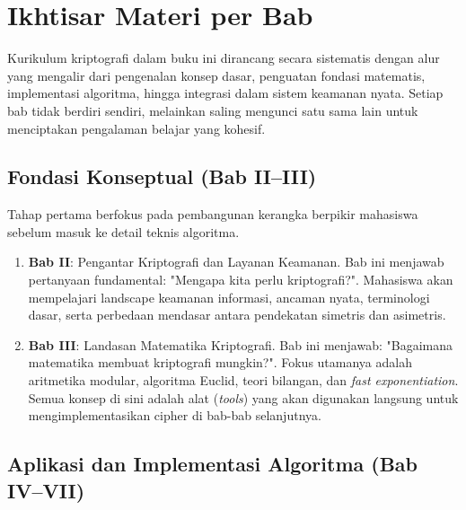 \section{Ikhtisar Materi per Bab}

Kurikulum kriptografi dalam buku ini dirancang secara sistematis dengan alur yang mengalir dari pengenalan konsep dasar, penguatan fondasi matematis, implementasi algoritma, hingga integrasi dalam sistem keamanan nyata. Setiap bab tidak berdiri sendiri, melainkan saling mengunci satu sama lain untuk menciptakan pengalaman belajar yang kohesif.

\subsection{Fondasi Konseptual (Bab II--III)}

Tahap pertama berfokus pada pembangunan kerangka berpikir mahasiswa sebelum masuk ke detail teknis algoritma.
\begin{enumerate}
  \item \textbf{Bab II}: Pengantar Kriptografi dan Layanan Keamanan. Bab ini menjawab pertanyaan fundamental: "Mengapa kita perlu kriptografi?". Mahasiswa akan mempelajari landscape keamanan informasi, ancaman nyata, terminologi dasar, serta perbedaan mendasar antara pendekatan simetris dan asimetris.
  \item \textbf{Bab III}: Landasan Matematika Kriptografi. Bab ini menjawab: "Bagaimana matematika membuat kriptografi mungkin?". Fokus utamanya adalah aritmetika modular, algoritma Euclid, teori bilangan, dan \textit{fast exponentiation}. Semua konsep di sini adalah alat (\textit{tools}) yang akan digunakan langsung untuk mengimplementasikan cipher di bab-bab selanjutnya.
\end{enumerate}

\subsection{Aplikasi dan Implementasi Algoritma (Bab IV--VII)}

